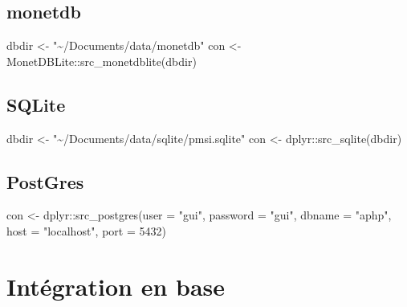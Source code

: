 \documentclass[
]{book}
\newenvironment{Shaded}{\begin{snugshade}}{\end{snugshade}}
\newcommand{\AttributeTok}[1]{\textcolor[rgb]{0.77,0.63,0.00}{#1}}
\newcommand{\DecValTok}[1]{\textcolor[rgb]{0.00,0.00,0.81}{#1}}
\newcommand{\FunctionTok}[1]{\textcolor[rgb]{0.00,0.00,0.00}{#1}}
\newcommand{\NormalTok}[1]{#1}
\newcommand{\OtherTok}[1]{\textcolor[rgb]{0.56,0.35,0.01}{#1}}
\newcommand{\SpecialCharTok}[1]{\textcolor[rgb]{0.00,0.00,0.00}{#1}}
\newcommand{\StringTok}[1]{\textcolor[rgb]{0.31,0.60,0.02}{#1}}
\begin{document}
\hypertarget{monetdb}{%
\subsection{monetdb}\label{monetdb}}

\begin{Shaded}
\begin{Highlighting}[]
\NormalTok{dbdir }\OtherTok{\textless{}{-}} \StringTok{"\textasciitilde{}/Documents/data/monetdb"}
\NormalTok{con }\OtherTok{\textless{}{-}}\NormalTok{ MonetDBLite}\SpecialCharTok{::}\FunctionTok{src\_monetdblite}\NormalTok{(dbdir)}
\end{Highlighting}
\end{Shaded}

\hypertarget{sqlite}{%
\subsection{SQLite}\label{sqlite}}

\begin{Shaded}
\begin{Highlighting}[]
\NormalTok{dbdir }\OtherTok{\textless{}{-}} \StringTok{"\textasciitilde{}/Documents/data/sqlite/pmsi.sqlite"}
\NormalTok{con }\OtherTok{\textless{}{-}}\NormalTok{ dplyr}\SpecialCharTok{::}\FunctionTok{src\_sqlite}\NormalTok{(dbdir)}
\end{Highlighting}
\end{Shaded}

\hypertarget{postgres}{%
\subsection{PostGres}\label{postgres}}

\begin{Shaded}
\begin{Highlighting}[]
\NormalTok{con }\OtherTok{\textless{}{-}}\NormalTok{ dplyr}\SpecialCharTok{::}\FunctionTok{src\_postgres}\NormalTok{(}\AttributeTok{user =} \StringTok{"gui"}\NormalTok{, }\AttributeTok{password =} \StringTok{"gui"}\NormalTok{, }\AttributeTok{dbname =} \StringTok{"aphp"}\NormalTok{,}
                    \AttributeTok{host =} \StringTok{"localhost"}\NormalTok{, }\AttributeTok{port =} \DecValTok{5432}\NormalTok{)}
\end{Highlighting}
\end{Shaded}

\hypertarget{intuxe9gration-en-base}{%
\section{Intégration en base}\label{intuxe9gration-en-base}}
\end{document}
